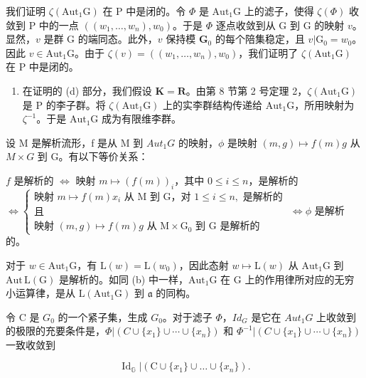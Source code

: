 我们证明 \(\zeta(\mathrm{Aut}_1\mathrm{G})\) 在 P 中是闭的。令 \(\Phi\) 是 \(\mathrm{Aut}_1\mathrm{G}\) 上的滤子，使得 \(\zeta(\Phi)\) 收敛到 P 中的一点 \(((w_1,\dots,w_n),w_0)\)。于是 \(\Phi\) 逐点收敛到从 G 到 G 的映射 \(v\)。显然，\(v\) 是群 G 的端同态。此外，\(v\) 保持模 \(\mathbf{G}_0\) 的每个陪集稳定，且 \(v |\mathrm{G}_0 = w_0\)。因此 \(v\in \mathrm{Aut}_1\mathrm{G}\)。由于 \(\zeta(v) = ((w_1,\dots,w_n),w_0)\)，我们证明了 \(\zeta(\mathrm{Aut}_1\mathrm{G})\) 在 P 中是闭的。

\begin{enumerate}
\def\labelenumi{(\alph{enumi})}
\setcounter{enumi}{3}
\tightlist
\item
  在证明的 (d) 部分，我们假设 \(\mathbf{K} = \mathbf{R}\)。由第 8 节第 2 号定理 2，\(\zeta(\mathrm{Aut}_1\mathrm{G})\) 是 P 的李子群。将 \(\zeta(\mathrm{Aut}_1\mathrm{G})\) 上的实李群结构传递给 \(\mathrm{Aut}_1\mathrm{G}\)，所用映射为 \(\zeta^{-1}\)。于是 \(\mathrm{Aut}_1\mathrm{G}\) 成为有限维李群。
\end{enumerate}

设 M 是解析流形，f 是从 M 到 \(Aut_{1}G\) 的映射，\(\phi\) 是映射 \((m,g)\mapsto f(m)g\) 从 \(M\times G\) 到 G。有以下等价关系：

\(f\) 是解析的 \(\Leftrightarrow\) 映射 \(m\mapsto (f(m))_i\)，其中 \(0\leqslant i\leqslant n\)，是解析的 \(\Leftrightarrow \left\{ \begin{array}{ll}\text{映射 } m\mapsto f(m)x_i\text{ 从 M 到 G，对 } 1\leqslant i\leqslant n,\text{ 是解析的} \\ \text{且} \\ \text{映射 } (m,g)\mapsto f(m)g\text{ 从 M} \times \mathrm{G}_0\text{ 到 G 是解析的} \end{array} \right.\) \(\Leftrightarrow \phi\) 是解析的。

对于 \(w \in \mathrm{Aut}_1\mathrm{G}\)，有 \(\mathrm{L}(w) = \mathrm{L}(w_0)\)，因此态射 \(w \mapsto \mathrm{L}(w)\) 从 \(\mathrm{Aut}_1\mathrm{G}\) 到 \(\mathrm{Aut}\, \mathrm{L}(\mathrm{G})\) 是解析的。如同 (b) 中一样，\(\mathrm{Aut}_1\mathrm{G}\) 在 \(\mathrm{G}\) 上的作用律所对应的无穷小运算律，是从 \(\mathrm{L}(\mathrm{Aut}_1\mathrm{G})\) 到 \(\mathfrak{a}\) 的同构。

令 C 是 \(G_{0}\) 的一个紧子集，生成 \(G_{0}\)。对于滤子 \(\Phi\)，\(Id_{G}\) 是它在 \(Aut_{1}G\) 上收敛到的极限的充要条件是，\(\Phi|(C \cup \{x_{1}\} \cup \cdots \cup \{x_{n}\})\) 和 \(\Phi^{-1}|(C \cup \{x_{1}\} \cup \cdots \cup \{x_{n}\})\) 一致收敛到

\[
\operatorname{Id} _ {\mathbb {G}} \left| \left(\mathrm{C} \cup \{x _ {1} \} \cup \dots \cup \{x _ {n} \}\right). \right.
\]

